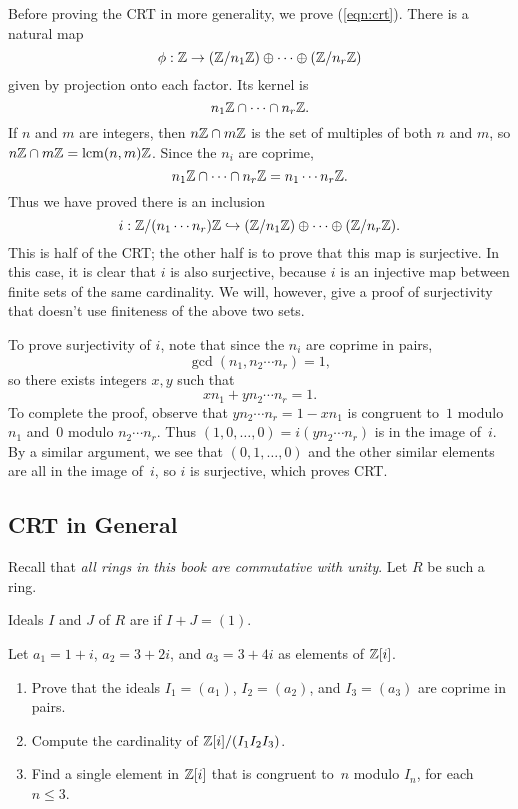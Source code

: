 Before proving the CRT in more generality, we prove
(\ref{eqn:crt}).
There is a natural map
$$
  \phi: \mathbb{Z} \to (\mathbb{Z}/n_1\mathbb{Z})\oplus \cdots \oplus (\mathbb{Z}/n_r\mathbb{Z})
$$
given by projection onto each factor.  Its kernel is
$$
 n_1 \mathbb{Z} \cap \cdots \cap n_r \mathbb{Z}.
$$
If $n$ and $m$ are integers, then $n\mathbb{Z}\cap m\mathbb{Z}$ is the
set of multiples of both $n$ and $m$, so $n\mathbb{Z}\cap m\mathbb{Z} = \operatorname{lcm}(n,m)\mathbb{Z}$.
Since the $n_i$ are coprime,
$$
 n_1 \mathbb{Z} \cap \cdots \cap n_r \mathbb{Z} = n_1 \cdots n_r \mathbb{Z}.
$$
Thus we have proved there is an inclusion
\begin{equation}\label{eqn:crt_inj}
 i: \mathbb{Z}/(n_1\cdots n_r)\mathbb{Z} \hookrightarrow (\mathbb{Z}/n_1\mathbb{Z}) \oplus \cdots \oplus (\mathbb{Z}/n_r\mathbb{Z}).
\end{equation}
This is half of the CRT; the other half is to prove that this map is
surjective.  In this case, it is clear that $i$ is also surjective,
because $i$ is an injective map between finite sets of the same cardinality.
We will, however, give a proof of surjectivity that doesn't use
finiteness of the above two sets.

To prove surjectivity of $i$, note that since the $n_i$ are coprime in
pairs, $$\gcd(n_1, n_2\cdots n_r)=1,$$ so there exists integers $x,y$
such that
$$
   x n_1 + y n_2\cdots n_r = 1.
$$
To complete the proof, observe that
$ y n_2\cdots n_r = 1 - x n_1$
is congruent to~$1$ modulo $n_1$ and~$0$ modulo $n_2\cdots n_r$.
Thus $(1,0, \dots,0) = i (y n_2\cdots n_r)$ is in the image of~$i$.
By a similar argument, we see that $(0,1, \dots,0)$ and the
other similar elements are all in the image of~$i$, so $i$
is surjective, which proves CRT.

\subsection{CRT in General}
Recall that {\em all rings in this book are commutative with unity}.
Let $R$ be such a ring.

\begin{definition}[Coprime]
  Ideals $I$ and $J$ of $R$ are  if $I+J=(1)$.
\end{definition}

\begin{exercise}
  Let $a_1 = 1+i$, $a_2 = 3+2i$, and $a_3 = 3+4i$ as elements of $\mathbb{Z}[i]$.
  \begin{enumerate}
    \item Prove that the ideals $I_1=(a_1)$, $I_2=(a_2)$, and $I_3=(a_3)$
    are coprime in pairs.
    \item Compute the cardinality of $\mathbb{Z}[i]/(I_1 I_2 I_3)$.
    \item Find a single element in $\mathbb{Z}[i]$ that is congruent to~$n$
    modulo $I_n$, for each $n\leq 3$.
  \end{enumerate}
\end{exercise}

